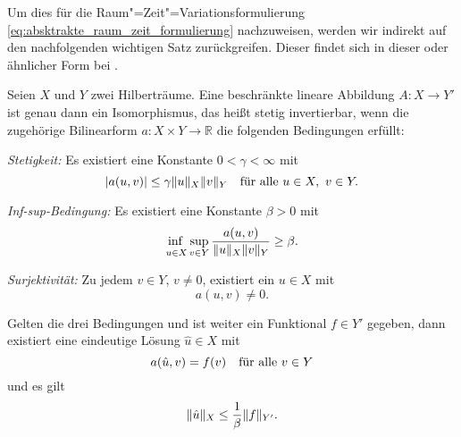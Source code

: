\documentclass[../main.tex]{subfiles}
\begin{document}
Um dies für die Raum"=Zeit"=Variationsformulierung \cref{eq:absktrakte_raum_zeit_formulierung} nachzuweisen, werden wir indirekt auf den nachfolgenden wichtigen Satz zurückgreifen.
Dieser findet sich in dieser oder ähnlicher Form bei \textcites[Theorem 2.1]{Babuska:1971fx}[Theorem 5.2.1]{Aziz:1972wf}[Theorem \S{}3.3.6]{Braess:2007wm}.

\begin{Satz}
\label{satz:bnb_theorem}
    Seien $X$ und $Y$ zwei Hilberträume.
    Eine beschränkte lineare Abbildung $A \colon X \to Y'$ ist genau dann ein Isomorphismus, das heißt stetig invertierbar, wenn die zugehörige Bilinearform $a \colon X \times Y \to \mathbb{R}$ die folgenden Bedingungen erfüllt:
    \begin{thmenumerate}
        \item \label{satz:bnb_theorem:stetig}
        \emph{Stetigkeit:}
        Es existiert eine Konstante $0 < \gamma < \infty$ mit
        \begin{equation}
            \abs{a(u, v)} \leq \gamma \norm{u}_{X} \norm{v}_{Y} \quad \fa u \in X,~v\in Y.
        \end{equation}
        \item \label{satz:bnb_theorem:inf_sup_bedingung}
        \emph{Inf-sup-Bedingung:}
        Es existiert eine Konstante $\beta > 0$ mit
        \begin{equation}
            \infsup{u \in X}{v \in Y} \frac{a(u, v)}{\norm{u}_{X} \norm{v}_{Y}} \geq \beta.
        \end{equation}
        \item \label{satz:bnb_theorem:surjektiv}
        \emph{Surjektivität:}
        Zu jedem $v \in Y$, $v \neq 0$, existiert ein $u \in X$ mit
        \begin{equation}
            a(u, v) \neq 0.
        \end{equation}
    \end{thmenumerate}
    Gelten die drei Bedingungen und ist weiter ein Funktional $f \in Y'$ gegeben, dann existiert eine eindeutige Lösung $\hat u \in X$ mit
    \begin{equation}
        a(\hat u, v) = f(v) \quad \fa v \in Y
    \end{equation}
    und es gilt
    \begin{equation}
        \norm{\hat u}_{X} \leq \frac{1}{\beta} \norm{f}_{Y'}.
    \end{equation}
\end{Satz}
\end{document}
